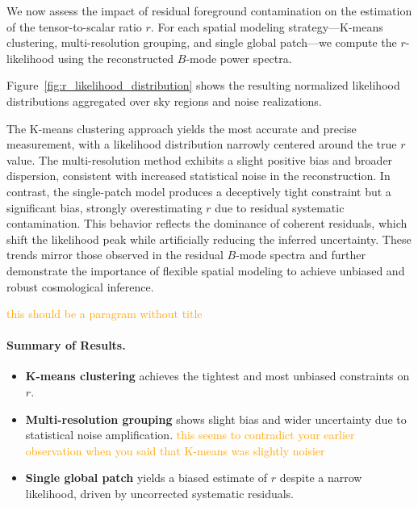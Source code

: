 \documentclass[fleqn,usenatbib]{mnras}
\newcommand{\je}[1]{\textcolor{orange}{#1}}
\begin{document}
We now assess the impact of residual foreground contamination on the estimation of the tensor-to-scalar ratio \( r \).
For each spatial modeling strategy—K-means clustering, multi-resolution grouping, and single global patch—we compute the \( r \)-likelihood using the reconstructed \( B \)-mode power spectra.

Figure~\ref{fig:r_likelihood_distribution} shows the resulting normalized likelihood distributions aggregated over sky regions and noise realizations.

The K-means clustering approach yields the most accurate and precise measurement, with a likelihood distribution narrowly centered around the true \( r \) value. 
The multi-resolution method exhibits a slight positive bias and broader dispersion, consistent with increased statistical noise in the reconstruction. 
In contrast, the single-patch model produces a deceptively tight constraint but a significant bias, strongly overestimating \( r \) due to residual systematic contamination.
This behavior reflects the dominance of coherent residuals, which shift the likelihood peak while artificially reducing the inferred uncertainty.
These trends mirror those observed in the residual \( B \)-mode spectra and further demonstrate the importance of flexible spatial modeling to achieve unbiased and robust cosmological inference.

\je{this should be a paragram without title}
\paragraph{Summary of Results.}
\begin{itemize}
    \item \textbf{K-means clustering} achieves the tightest and most unbiased constraints on \( r \).
    \item \textbf{Multi-resolution grouping} shows slight bias and wider uncertainty due to statistical noise amplification. \je{this seems to contradict your earlier observation when you said that K-means was slightly noisier}
    \item \textbf{Single global patch} yields a biased estimate of \( r \) despite a narrow likelihood, driven by uncorrected systematic residuals.
\end{itemize}
\end{document}
